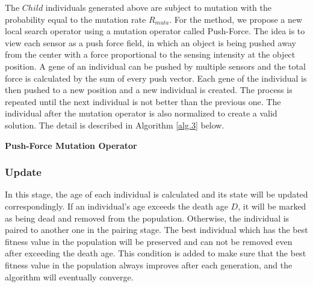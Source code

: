 \documentclass[final]{elsarticle}
\begin{document}
The $Child$ individuals generated above are subject to mutation with the probability equal to the mutation rate $R_{muta}$. For the method, we propose a new local search operator using a mutation operator called Push-Force. The idea is to view each sensor as a push force field, in which an object is being pushed away from the center with a force proportional to the sensing intensity at the object position. A gene of an individual can be pushed by multiple sensors and the total force is calculated by the sum of every push vector. Each gene of the individual is then pushed to a new position and a new individual is created. The process is repeated until the next individual is not better than the previous one. The individual after the mutation operator is also normalized to create a valid solution. The detail is described in Algorithm \ref{alg.3} below.
\begin{algorithm}[H]
	\SetAlgoLined
	\caption{\textbf{Push-Force Mutation Operator}} 
	\label{alg.3}
\end{algorithm} 

\subsubsection{Update}

In this stage, the age of each individual is calculated and its state will be updated correspondingly. If an individual's age exceeds the death age $D$, it will be marked as being dead and removed from the population. Otherwise, the individual is paired to another one in the pairing stage. The best individual which has the best fitness value in the population will be preserved and can not be removed even after exceeding the death age. This condition is added to make sure that the best fitness value in the population always improves after each generation, and the algorithm will eventually converge.
\end{document}
